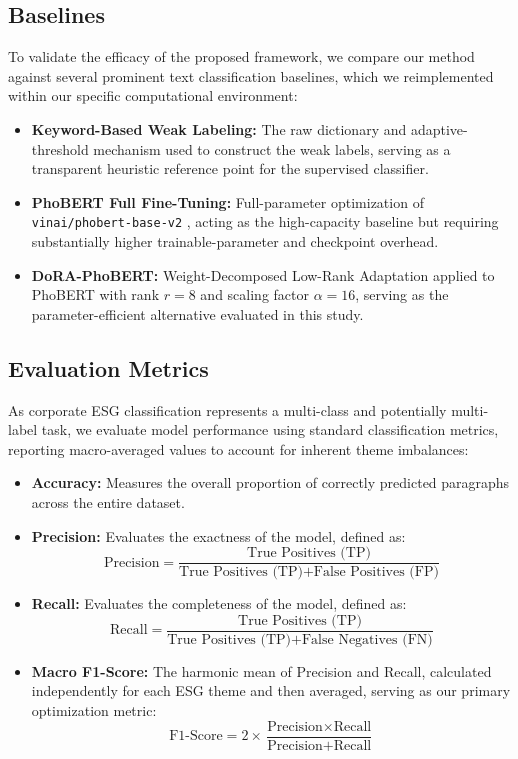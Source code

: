 \documentclass{article}
\theoremstyle{plain}
\theoremstyle{definition}
\theoremstyle{remark}
\begin{document}
\subsection{Baselines}
To validate the efficacy of the proposed framework, we compare our method against several prominent text classification baselines, which we reimplemented within our specific computational environment:
\begin{itemize}
    \item \textbf{Keyword-Based Weak Labeling:} The raw dictionary and adaptive-threshold mechanism used to construct the weak labels, serving as a transparent heuristic reference point for the supervised classifier.
    \item \textbf{PhoBERT Full Fine-Tuning:} Full-parameter optimization of \texttt{vinai/phobert-base-v2} \citep{nguyen2020phobert}, acting as the high-capacity baseline but requiring substantially higher trainable-parameter and checkpoint overhead.
    \item \textbf{DoRA-PhoBERT:} Weight-Decomposed Low-Rank Adaptation \citep{liu2024dora} applied to PhoBERT with rank $r=8$ and scaling factor $\alpha=16$, serving as the parameter-efficient alternative evaluated in this study.
\end{itemize}

\subsection{Evaluation Metrics}
As corporate ESG classification represents a multi-class and potentially multi-label task, we evaluate model performance using standard classification metrics, reporting macro-averaged values to account for inherent theme imbalances:
\begin{itemize}
    \item \textbf{Accuracy:} Measures the overall proportion of correctly predicted paragraphs across the entire dataset.
    \item \textbf{Precision:} Evaluates the exactness of the model, defined as:
    \begin{equation}
        \text{Precision} = \frac{\text{True Positives (TP)}}{\text{True Positives (TP)} + \text{False Positives (FP)}}
    \end{equation}
    \item \textbf{Recall:} Evaluates the completeness of the model, defined as:
    \begin{equation}
        \text{Recall} = \frac{\text{True Positives (TP)}}{\text{True Positives (TP)} + \text{False Negatives (FN)}}
    \end{equation}
    \item \textbf{Macro F1-Score:} The harmonic mean of Precision and Recall, calculated independently for each ESG theme and then averaged, serving as our primary optimization metric:
    \begin{equation}
        \text{F1-Score} = 2 \times \frac{\text{Precision} \times \text{Recall}}{\text{Precision} + \text{Recall}}
    \end{equation}
\end{itemize}
\end{document}
